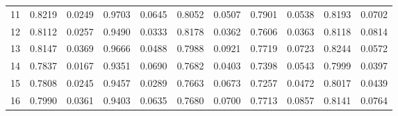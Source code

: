 \begin{tabular}{rrrrrrrrrrr}
        11 &   0.8219 & 0.0249 &               0.9703 & 0.0645 &                   0.8052 & 0.0507 &               0.7901 & 0.0538 &                       0.8193 & 0.0702 \\
        12 &   0.8112 & 0.0257 &               0.9490 & 0.0333 &                   0.8178 & 0.0362 &               0.7606 & 0.0363 &                       0.8118 & 0.0814 \\
        13 &   0.8147 & 0.0369 &               0.9666 & 0.0488 &                   0.7988 & 0.0921 &               0.7719 & 0.0723 &                       0.8244 & 0.0572 \\
        14 &   0.7837 & 0.0167 &               0.9351 & 0.0690 &                   0.7682 & 0.0403 &               0.7398 & 0.0543 &                       0.7999 & 0.0397 \\
        15 &   0.7808 & 0.0245 &               0.9457 & 0.0289 &                   0.7663 & 0.0673 &               0.7257 & 0.0472 &                       0.8017 & 0.0439 \\
        16 &   0.7990 & 0.0361 &               0.9403 & 0.0635 &                   0.7680 & 0.0700 &               0.7713 & 0.0857 &                       0.8141 & 0.0764 \\
\bottomrule
\end{tabular}
